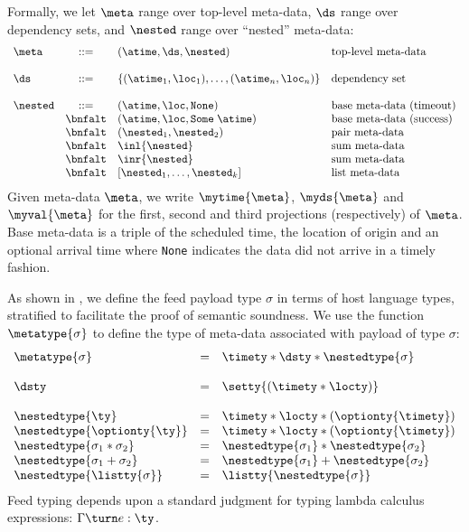 Formally, we let 
$\meta$ range over top-level meta-data,
$\ds$ range over dependency sets, and 
$\nested$ range over ``nested'' meta-data:
\[
\begin{array}{lcll} 
\meta & ::= & (\atime,\ds,\nested) & \mbox{top-level meta-data} \\  
\\
\ds   & ::= & \{(\atime_1,\loc_1),\ldots,(\atime_n, \loc_n) \}  & \mbox{dependency set}\\ 
\\
\nested & ::=     
          & (\atime,\loc,\mathtt{None}) & \mbox{base meta-data (timeout)} \\
& \bnfalt & (\atime,\loc,\mathtt{Some}\; \atime) & \mbox{base meta-data (success)} \\
& \bnfalt & (\nested_1,\nested_2) & \mbox{pair meta-data} \\
& \bnfalt & \inl{\nested} & \mbox{sum meta-data} \\
& \bnfalt & \inr{\nested} & \mbox{sum meta-data} \\
& \bnfalt & [\nested_1,\ldots,\nested_k] & \mbox{list meta-data} \\
\end{array}
\] 
Given meta-data $\meta$, we write $\mytime{\meta}$, $\myds{\meta}$ and
$\myval{\meta}$ for the first, second and third projections (respectively) of $\meta$.
Base meta-data is a triple of the scheduled time, the location of origin 
and an optional arrival time where {\tt None} indicates the data did not arrive
in a timely fashion.

As shown in , we define the feed payload type
$\sigma$ in terms of host 
language types, stratified to facilitate the proof of
semantic soundness.  
We use the function $\metatype{\sigma}$ to define the type of
meta-data associated with payload of type $\sigma$:
\[
\begin {array} {lcl}
\metatype{\sigma} & = & \timety * \dsty * \nestedtype{\sigma} \\
\\
\dsty & = & \setty{(\timety * \locty)}  \\
\\
\nestedtype{\ty} & = & \timety * \locty * (\optionty{\timety}) \\
\nestedtype{\optionty{\ty}} & = & \timety * \locty * (\optionty{\timety}) \\
\nestedtype{\sigma_1 * \sigma_2} & = & \nestedtype{\sigma_1} * \nestedtype{\sigma_2} \\
\nestedtype{\sigma_1 + \sigma_2} & = & \nestedtype{\sigma_1} + \nestedtype{\sigma_2} \\
\nestedtype{\listty{\sigma}} & = & \listty{\nestedtype{\sigma}} \\
\end{array}
\]
Feed typing depends upon a standard judgment for
typing lambda calculus expressions: $\Gamma \turn e : \ty$.  


